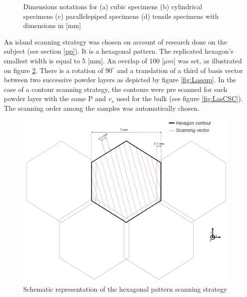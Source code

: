 \begin{figure}[ht]
\centering
\noindent{}
\decoRule
\caption[Dimensions notations for (a) cubic specimens (b) cylindrical specimens (c) parallelepiped specimens (d) tensile specimen]{Dimensions notations for (a) cubic specimens (b) cylindrical specimens (c) parallelepiped specimens (d) tensile specimens with dimensions in [mm]}
\label{fig:cc}
\end{figure}


An island scanning strategy was chosen on account of research done on the subject (see section \ref{pp}). It is a hexagonal pattern. The replicated hexagon's smallest width is equal to 5 [mm]. An overlap of 100 [$\mu m$] was set, as illustrated on figure \ref{fig:OL}. There is a rotation of $90^\circ$ and a translation of a third of basis vector between two successive powder layers as depicted by figure \ref{fig:Lassup}. In the case of a contour scanning strategy, the contours were pre scanned for each powder layer with the same P and $v_s$ used for the bulk (see figure \ref{fig:LasCSC}). The scanning order among the samples was automatically chosen. \\

\begin{figure}[ht]
\centering
\includegraphics[scale=0.27]{Images/OL}
\decoRule
\caption[Schematic representation of the hexagonal pattern scanning strategy]{Schematic representation of the hexagonal pattern scanning strategy}
\label{fig:OL}
\end{figure}

